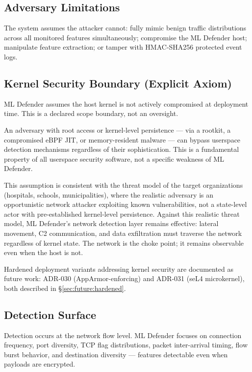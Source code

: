 \documentclass[11pt,a4paper]{article}
\begin{document}
    \subsection{Adversary Limitations}
    The system assumes the attacker cannot: fully mimic benign traffic distributions across all
    monitored features simultaneously; compromise the ML Defender host; manipulate feature
    extraction; or tamper with HMAC-SHA256 protected event logs.

    \subsection{Kernel Security Boundary (Explicit Axiom)}
    \label{sec:threatmodel:kernel}

    ML Defender assumes the host kernel is not actively compromised at deployment time.
    This is a declared scope boundary, not an oversight.

    An adversary with root access or kernel-level persistence --- via a rootkit, a
    compromised eBPF JIT, or memory-resident malware --- can bypass userspace detection
    mechanisms regardless of their sophistication. This is a fundamental property of all
    userspace security software, not a specific weakness of ML Defender.

    This assumption is consistent with the threat model of the target organizations
    (hospitals, schools, municipalities), where the realistic adversary is an
    opportunistic network attacker exploiting known vulnerabilities, not a state-level
    actor with pre-established kernel-level persistence. Against this realistic threat
    model, ML Defender's network detection layer remains effective: lateral movement,
    C2 communication, and data exfiltration must traverse the network regardless of
    kernel state. The network is the choke point; it remains observable even when the
    host is not.

    Hardened deployment variants addressing kernel security are documented as future
    work: ADR-030 (AppArmor-enforcing) and ADR-031 (seL4 microkernel),
    both described in \S\ref{sec:future:hardened}.

    \subsection{Detection Surface}
    Detection occurs at the network flow level. ML Defender focuses on connection frequency,
    port diversity, TCP flag distributions, packet inter-arrival timing, flow burst behavior, and
    destination diversity --- features detectable even when payloads are encrypted.
\end{document}
